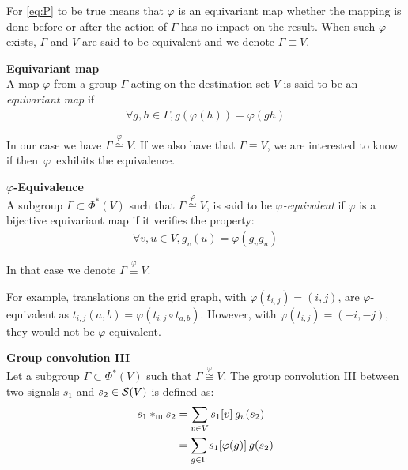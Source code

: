 For \eqref{eq:P} to be true means that $\varphi$ is an equivariant map \ie whether the mapping is done before or after the action of $\Gamma$ has no impact on the result. When such $\varphi$ exists, $\Gamma$ and $V$ are said to be equivalent and we denote $\Gamma \equiv V$.

\begin{definition}\textbf{Equivariant map}\\
A map $\varphi$ from a group $\Gamma$ acting on the destination set $V$ is said to be an \emph{equivariant map} if
\begin{gather*}
\forall g, h \in \Gamma, g(\varphi(h)) = \varphi(gh)
\end{gather*}
\label{def:eqmap}
\end{definition}

In our case we have $\Gamma \overset{\varphi}{\cong} V$. If we also have that $\Gamma \equiv V$, we are interested to know if then~$\varphi$~exhibits the equivalence.

\begin{definition}\textbf{$\varphi$-Equivalence}\\
A subgroup $\Gamma \subset \Phi^*(V)$ such that $\Gamma \overset{\varphi}{\cong} V$, is said to be \emph{$\varphi$-equivalent} if $\varphi$ is a bijective equivariant map \ie if it verifies the property:
\begin{gather*}
\forall v, u \in V, g_v(u) = \varphi(g_vg_u) \tag{P}\label{eq:P}
\end{gather*}
\end{definition}

In that case we denote $\Gamma \overset{\varphi}{\equiv} V$.

\begin{remark}
For example, translations on the grid graph, with $\varphi(t_{i,j}) = (i,j)$, are $\varphi$-equivalent as $t_{i,j}(a,b) = \varphi(t_{i,j} \circ t_{a,b})$. However, with $\varphi(t_{i,j}) = (-i,-j)$, they would not be $\varphi$-equivalent.
\end{remark}

\begin{definition}\textbf{Group convolution III}\\
Let a subgroup $\Gamma \subset \Phi^*(V)$ such that $\Gamma \overset{\varphi}{\cong} V$.
The group convolution III between two signals $s_1$ and $s_2 \in \cs(V)$ is defined as:
\begin{align}
s_1 \ast_{\III} s_2 & = \displaystyle \sum_{v \in V} s_1[v] \h{2} g_v(s_2)\label{eq:vdom}\\
& = \displaystyle \sum_{g \in \Gamma} s_1[\varphi(g)] \h{2} g(s_2) \label{eq:premix}
\end{align}
\label{def:conv3}
\end{definition}

